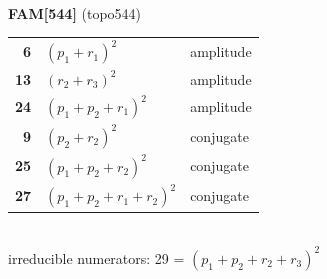 \documentclass[10pt]{article}
\begin{document}
\begin{minipage}[t]{0.48\textwidth}
{}\\[2mm]\textbf{FAM[544]} (topo544)\\[2pt]{\footnotesize\begin{tabular}{@{}r@{\ \ }l@{\ \ }l@{}}\textbf{6} & $(p_1+r_1)^2$ & amplitude\\
\textbf{13} & $(r_2+r_3)^2$ & amplitude\\
\textbf{24} & $(p_1+p_2+r_1)^2$ & amplitude\\
\textbf{9} & $(p_2+r_2)^2$ & conjugate\\
\textbf{25} & $(p_1+p_2+r_2)^2$ & conjugate\\
\textbf{27} & $(p_1+p_2+r_1+r_2)^2$ & conjugate\\\end{tabular}}\\[2pt]{\scriptsize irreducible numerators: 29 = $(p_1+p_2+r_2+r_3)^2$}\end{minipage}\hfill%
\end{document}
